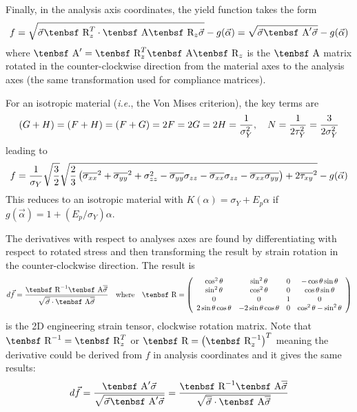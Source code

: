\documentclass[11pt]{article}
\def\A{\hbox{\tenbsf A}}
\def\df{d \vec{f}}
\def\R{\hbox{\tenbsf R}}
\def\s#1{\sigma_{#1}}
\def\t#1{\tau_{#1}}
\begin{document}
Finally, in the analysis axis coordinates, the yield function takes the form
\begin{equation}
     f = \sqrt{\vec\s{} \R_z^T\cdot \A \R_z\vec\s{}} - g(\vec\alpha) = \sqrt{\vec\s{} \A' \vec\s{}} - g(\vec\alpha)
\end{equation}
where $\A' = \R_z^T\A\R_z$ is the $\A$ matrix rotated in the counter-clockwise direction from the material axes to the analysis axes (the same transformation used for compliance matrices).

For an isotropic material ({\em i.e.}, the Von Mises criterion), the key terms are
\begin{equation}
   (G+H) = (F+H) = (F+G) = 2F = 2G = 2H = {1\over \sigma_Y^2}, \quad N = {1\over 2\tau_Y^2} = {3\over 2\sigma_Y^2}
\end{equation}
leading to
\begin{equation}
          f =  {1\over \sigma_Y} \sqrt{3\over2}\sqrt{{2\over 3}\left(\overline{\s{xx}}^2  + \overline{\s{yy}}^2 + \s{zz}^2
                   - \overline{\s{yy}}\s{zz} -  \overline{\s{xx}}\s{zz}
                    -  \overline{\s{xx}}\overline{\s{yy}}\right)
                   +2\overline{\t{xy}}^2 }  - g(\vec\alpha)
\end{equation}
This reduces to an isotropic material with $K(\alpha)=\sigma_Y + E_p\alpha$ if $g(\vec\alpha) = 1 + (E_p/\sigma_Y)\alpha$.

The derivatives with respect to analyses axes are found by differentiating with respect to rotated stress and then transforming the result by strain rotation in the counter-clockwise direction. The result is
\begin{equation}
         \df = {\R^{-1}\A \overline{\vec\s{}}\over\sqrt{\overline{\vec\s{}} \cdot \A \overline{\vec\s{}}}}    \quad{\rm where}\quad
         \R = \left( \begin{array}{cccc}
                       \cos^2\theta & \sin^2\theta & 0 & -\cos\theta\sin\theta \\
                       \sin^2\theta & \cos^2\theta & 0 & \cos\theta\sin\theta \\
                       0 & 0 & 1 & 0 \\
                       2\sin\theta\cos\theta & -2\sin\theta\cos\theta & 0 & \cos^2\theta - \sin^2\theta
                       \end{array} \right)
\end{equation}
is the 2D engineering strain tensor, clockwise rotation matrix. Note that $\R^{-1} = \R_z^T$ or $\R = \left(\R_z^{-1}\right)^T$ meaning the derivative could be derived from $f$ in analysis coordinates and it gives the same results:
\begin{equation}
   \df = {\A' \vec\s{}\over\sqrt{\vec\s{} \A' \vec\s{}}}  = {\R^{-1}\A \overline{\vec\s{}}\over\sqrt{\overline{\vec\s{}} \cdot \A \overline{\vec\s{}}}} 
\end{equation}
\end{document}

